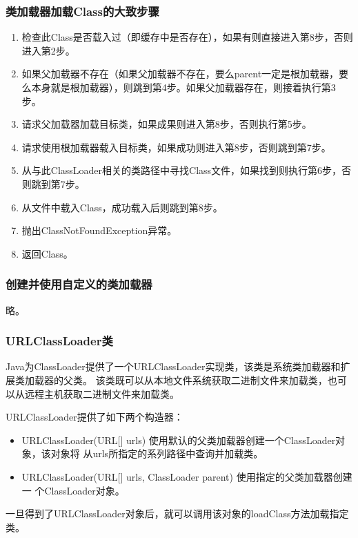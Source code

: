 \documentclass[hyperref={pdfpagelabels=false},compress,table]{beamer} %
\newcommand{\kai}{\CJKfamily{KaiTi}}
\begin{document}
\begin{frame}[fragile] %
\frametitle{类加载器加载Class的大致步骤}
\begin{enumerate}\kai
\item 检查此Class是否载入过（即缓存中是否存在），如果有则直接进入第8步，否则进入第2步。
\item 如果父加载器不存在（如果父加载器不存在，要么parent一定是根加载器，要么本身就是根加载器），则跳到第4步。如果父加载器存在，则接着执行第3步。
\item 请求父加载器加载目标类，如果成果则进入第8步，否则执行第5步。
\item 请求使用根加载器载入目标类，如果成功则进入第8步，否则跳到第7步。
\item 从与此ClassLoader相关的类路径中寻找Class文件，如果找到则执行第6步，否则跳到第7步。
\item 从文件中载入Class，成功载入后则跳到第8步。
\item 抛出ClassNotFoundException异常。
\item 返回Class。
\end{enumerate}
\end{frame}

\begin{frame}[fragile] %
\frametitle{创建并使用自定义的类加载器}
略。

\end{frame}

\begin{frame}[fragile] %
\frametitle{URLClassLoader类}
Java为ClassLoader提供了一个URLClassLoader实现类，该类是系统类加载器和扩展类加载器的父类。
该类既可以从本地文件系统获取二进制文件来加载类，也可以从远程主机获取二进制文件来加载类。

URLClassLoader提供了如下两个构造器：

\begin{itemize}
\item URLClassLoader(URL[] urls) 使用默认的父类加载器创建一个ClassLoader对象，该对象将
  从urls所指定的系列路径中查询并加载类。
\item URLClassLoader(URL[] urls, ClassLoader parent) 使用指定的父类加载器创建一
  个ClassLoader对象。
\end{itemize}
一旦得到了URLClassLoader对象后，就可以调用该对象的loadClass方法加载指定类。
\end{frame}
\end{document}
